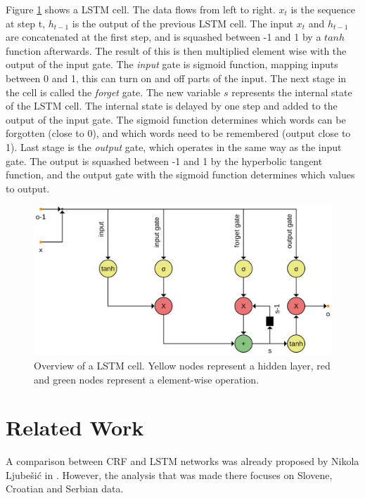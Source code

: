\documentclass[12pt]{book}
\begin{document}
	Figure \ref{img:lstm} shows a LSTM cell. The data flows from left to right. $x_t$ is the sequence at step t, $h_{t-1}$ is the output of the previous LSTM cell. The input $x_t$ and $h_{t-1}$ are concatenated at the first step, and is squashed between -1 and 1 by a $tanh$ function afterwards. The result of this is then multiplied element wise with the output of the input gate. The \textit{input} gate is sigmoid function, mapping inputs between 0 and 1, this can turn on and off parts of the input. 
	The next stage in the cell is called the \textit{forget} gate. The new variable $s$ represents the internal state of the LSTM cell. The internal state is delayed by one step and added to the output of the input gate. The sigmoid function determines which words can be forgotten (close to 0), and which words need to be remembered (output close to 1).
	Last stage is the \textit{output} gate, which operates in the same way as the input gate. The output is squashed between -1 and 1 by the hyperbolic tangent function, and the output gate with the sigmoid function determines which values to output.
	
	\begin{figure}
		\begin{center}
			\includegraphics[width=0.75\linewidth]{img/lstm.png}
		\end{center}
		\caption{Overview of a LSTM cell. Yellow nodes represent a hidden layer, red and green nodes represent a element-wise operation.}	
		\label{img:lstm}
	\end{figure}
	
	\section{Related Work}
	\label{sec:relatedwork}
	
	A comparison between CRF and LSTM networks was already proposed by Nikola Ljube{\v{s}}i{\'c} in \cite{ljubevsic2018comparing}. However, the analysis that was made there focuses on Slovene, Croatian and Serbian data.
	
\end{document}

